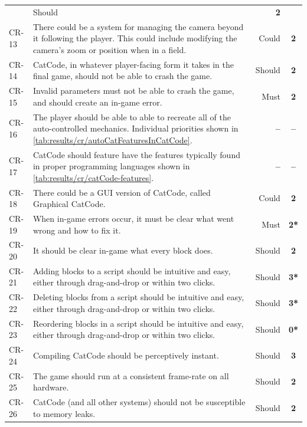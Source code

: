 \begin{center}
\begin{longtable}{lp{9.6cm}rc}
    & Should
    & \textbf{2}
    \\
    CR-13
    & There could be a system for managing the camera beyond it following the player. This could include modifying the camera's zoom or position when in a field.
    & Could
    & \textbf{2}
    \\
    CR-14
    & CatCode, in whatever player-facing form it takes in the final game, should not be able to crash the game.
    & Should
    & \textbf{2}
    \\
    CR-15
    & Invalid parameters must not be able to crash the game, and should create an in-game error.
    & Must
    & \textbf{2}
    \\
    CR-16
    & The player should be able to able to recreate all of the auto-controlled mechanics. Individual priorities shown in \autoref{tab:results/cr/autoCatFeaturesInCatCode}.
    & \textbf{--}
    & \textbf{--}
    \\
    CR-17
    & CatCode should feature have the features typically found in proper programming languages shown in \autoref{tab:results/cr/catCode-features}.
    & \textbf{--}
    & \textbf{--}
    \\
    CR-18
    & There could be a GUI version of CatCode, called Graphical CatCode.
    & Could
    & \textbf{2}
    \\
    CR-19
    & When in-game errors occur, it must be clear what went wrong and how to fix it.
    & Must
    & \textbf{2*}
    \\
    CR-20
    & It should be clear in-game what every block does.
    & Should
    & \textbf{2}
    \\
    CR-21
    & Adding blocks to a script should be intuitive and easy, either through drag-and-drop or within two clicks.
    & Should
    & \textbf{3*}
    \\
    CR-22
    & Deleting blocks from a script should be intuitive and easy, either through drag-and-drop or within two clicks.
    & Should
    & \textbf{3*}
    \\
    CR-23
    & Reordering blocks in a script should be intuitive and easy, either through drag-and-drop or within two clicks.
    & Should
    & \textbf{0*}
    \\
    CR-24
    & Compiling CatCode should be perceptively instant.
    & Should
    & \textbf{3}
    \\
    CR-25
    & The game should run at a consistent frame-rate on all hardware.
    & Should
    & \textbf{2}
    \\
    CR-26
    & CatCode (and all other systems) should not be susceptible to memory leaks.
    & Should
    & \textbf{2}
    \\
    \bottomrule
  \end{longtable}
\end{center}
